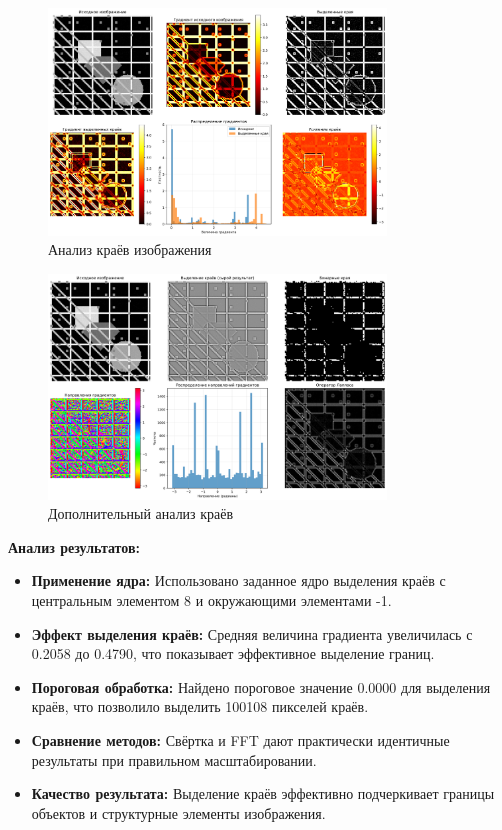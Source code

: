 \begin{figure}[H]
    \centering
    \includegraphics[width=0.8\textwidth]{images/task4/edge_analysis.png}
    \caption{Анализ краёв изображения}
    \label{fig:edge_analysis}
\end{figure}

\begin{figure}[H]
    \centering
    \includegraphics[width=0.8\textwidth]{images/task4/additional_edge_analysis.png}
    \caption{Дополнительный анализ краёв}
    \label{fig:additional_edge_analysis}
\end{figure}

\textbf{Анализ результатов:}
\begin{itemize}
    \item \textbf{Применение ядра:} Использовано заданное ядро выделения краёв с центральным элементом 8 и окружающими элементами -1.
    
    \item \textbf{Эффект выделения краёв:} Средняя величина градиента увеличилась с 0.2058 до 0.4790, что показывает эффективное выделение границ.
    
    \item \textbf{Пороговая обработка:} Найдено пороговое значение 0.0000 для выделения краёв, что позволило выделить 100108 пикселей краёв.
    
    \item \textbf{Сравнение методов:} Свёртка и FFT дают практически идентичные результаты при правильном масштабировании.
    
    \item \textbf{Качество результата:} Выделение краёв эффективно подчеркивает границы объектов и структурные элементы изображения.
\end{itemize}

